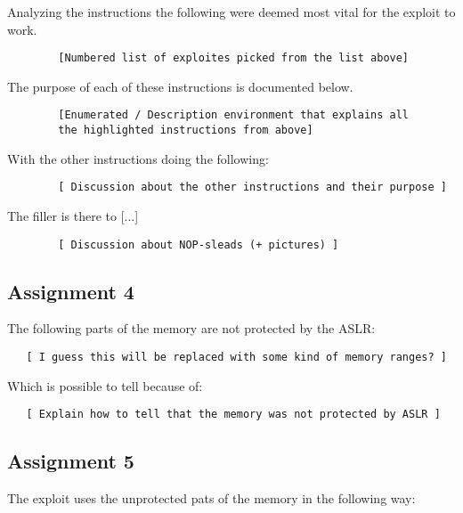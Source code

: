 \documentclass[10pt]{article}
\begin{document}
      Analyzing the instructions the following were deemed most vital for the
      exploit to work.

      \begin{verbatim}
        [Numbered list of exploites picked from the list above]
      \end{verbatim}

      The purpose of each of these instructions is documented below.

      \begin{verbatim}
        [Enumerated / Description environment that explains all
        the highlighted instructions from above]
      \end{verbatim}

      With the other instructions doing the following:

      \begin{verbatim}
        [ Discussion about the other instructions and their purpose ]
      \end{verbatim}

      The filler is there to [...]

      \begin{verbatim}
        [ Discussion about NOP-sleads (+ pictures) ]
      \end{verbatim}


    \subsection{Assignment 4}

      The following parts of the memory are not protected by the ASLR:

      \begin{verbatim}
   [ I guess this will be replaced with some kind of memory ranges? ]
      \end{verbatim}

      Which is possible to tell because of:

      \begin{verbatim}
   [ Explain how to tell that the memory was not protected by ASLR ]
      \end{verbatim}

    \subsection{Assignment 5}

      The exploit uses the unprotected pats of the memory in the following way:
\end{document}
